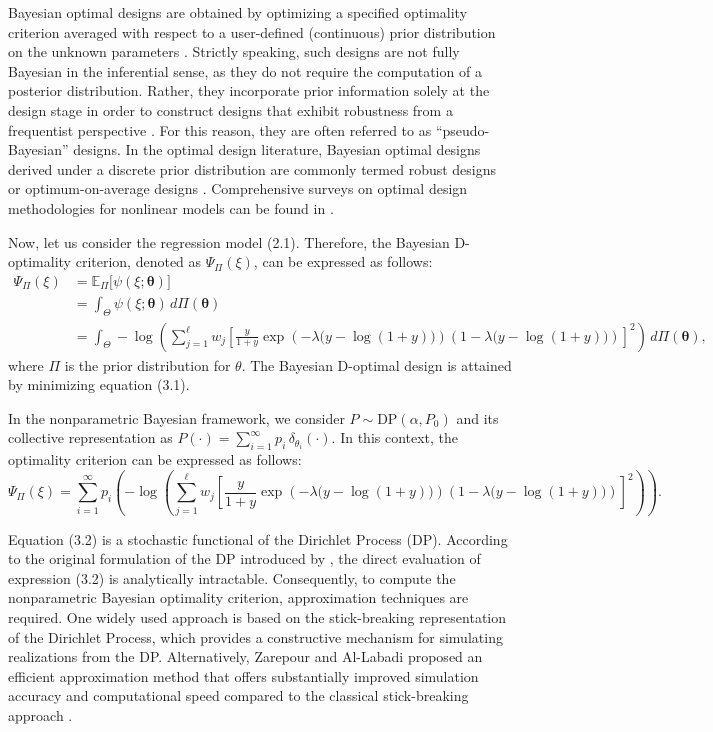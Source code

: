 \documentclass[twoside]{article}
\begin{document}
Bayesian optimal designs are obtained by optimizing a specified optimality criterion averaged with respect to a user-defined (continuous) prior distribution on the unknown parameters \cite{collett:2015}. Strictly speaking, such designs are not fully Bayesian in the inferential sense, as they do not require the computation of a posterior distribution. Rather, they incorporate prior information solely at the design stage in order to construct designs that exhibit robustness from a frequentist perspective \cite{Grashoff:2012}. For this reason, they are often referred to as ``pseudo-Bayesian'' designs. In the optimal design literature, Bayesian optimal designs derived under a discrete prior distribution are commonly termed robust designs or optimum-on-average designs \cite{Fedorov:2012, Fedorov:2013}. Comprehensive surveys on optimal design methodologies for nonlinear models can be found in \cite{Firth:1997, Ford:1992}.

Now, let us consider the regression model (2.1). Therefore, the Bayesian D-optimality criterion, denoted as $\Psi_{\Pi}(\xi)$, can be expressed as follows:
\begin{align}
\Psi_{\Pi}(\xi)
&= \mathbb{E}_{\Pi}\!\big[ \psi(\xi;\boldsymbol{\theta}) \big] \nonumber \\
&= \int_{\Theta} \psi(\xi;\boldsymbol{\theta}) \, d\Pi(\boldsymbol{\theta}) \nonumber \\
&= \int_{\Theta}
-\log\!\left(
\sum_{j=1}^{\ell} w_j
\left[
\frac{y}{1+y}
\exp\!\left(-\lambda\big(y-\log(1+y)\big)\right)
\left(1-\lambda\big(y-\log(1+y)\big)\right)
\right]^2
\right)
\, d\Pi(\boldsymbol{\theta}),
\end{align}
where $\Pi$ is the prior distribution for $\theta$. The Bayesian D-optimal design is attained by minimizing equation (3.1).

In the nonparametric Bayesian framework, we consider $P \sim \text{DP}(\alpha, P_0)$ and its collective representation as $P(\cdot) = \sum_{i=1}^{\infty} p_i \, \delta_{\theta_i}(\cdot)$. In this context, the optimality criterion can be expressed as follows:
\begin{equation}
\Psi_{\Pi}(\xi) = \sum_{i=1}^{\infty} p_i \left( -\log\!\left(
\sum_{j=1}^{\ell} w_j
\left[
\frac{y}{1+y}
\exp\!\left(-\lambda\big(y-\log(1+y)\big)\right)
\left(1-\lambda\big(y-\log(1+y)\big)\right)
\right]^2
\right) \right).
\end{equation}

Equation (3.2) is a stochastic functional of the Dirichlet Process (DP). According to the original formulation of the DP introduced by \cite{Ferguson:1973}, the direct evaluation of expression (3.2) is analytically intractable. Consequently, to compute the nonparametric Bayesian optimality criterion, approximation techniques are required. One widely used approach is based on the stick-breaking representation of the Dirichlet Process, which provides a constructive mechanism for simulating realizations from the DP. Alternatively, Zarepour and Al-Labadi \cite{Zarepour:2012} proposed an efficient approximation method that offers substantially improved simulation accuracy and computational speed compared to the classical stick-breaking approach \cite{Sethuraman:1994}. 
\end{document}
